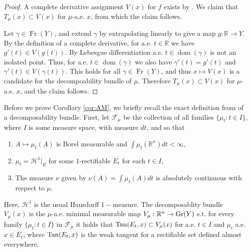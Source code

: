\documentclass{amsart}
\numberwithin{equation}{section}
\newcommand{\R}{\mathbb{R}}
\newcommand{\dom}{\operatorname{dom}}
\newcommand{\Fr}{\operatorname{Fr}}
\begin{document}
\begin{proof}
A complete derivative assignment $V(x)$ for $f$ exists by \cite[Proposition 5.1 and Theorem 5.7]{malevapreiss}. We claim that $T_\mu(x)\subset V(x)$ for $\mu$-a.e. $x$, from which the claim follows.

Let $\gamma \in \Fr(Y)$, and extend $\gamma$ by extrapolating linearly to give a map $g:\R\to Y$. By the definition of a complete derivative, for a.e. $t\in \R$ we have $g'(t)\in V(g(t))$. By Lebesgue differentiation a.e. $t\in \dom(\gamma)$ is not an isolated point. Thus, for a.e. $t\in \dom(\gamma)$ we also have $\gamma'(t)=g'(t)$ and $\gamma'(t)\in V(\gamma(t))$. This holds for all $\gamma\in \Fr(Y)$, and thus $x\mapsto V(x)$ is a candidate for the decompoability bundle of $\mu$. Therefore $T_\mu(x)\subset V(x)$ for $\mu$-a.e. $x$, and the claim follows.
\end{proof}
 
Before we prove Corollary \ref{cor:AM}, we briefly recall the exact definition from \cite[Section 2.6]{almar16} of a decomposability bundle. First, let $\mathcal{F}_\mu$ be the collection of all families $\{\mu_t : t\in I\}$, where $I$ is some measure space, with measure $dt$, and so that 
\begin{enumerate}
    \item $A\mapsto \mu_t(A)$ is Borel measurable and $\int \mu_t(\R^n) dt < \infty$,
    \item $\mu_t=\mathcal{H}^1|_E$ for some $1$-rectifiable $E_t$ for each $t\in I$,
    \item The measure $\nu$ given by $\nu(A)=\int \mu_t(A) dt$ is absolutely continuous with respect to $\mu$.
\end{enumerate}
Here, $\mathcal{H}^1$ is the usual Hausdorff $1-$measure.
The decomposablity bundle $V_\mu(x)$ is the $\mu$-a.e. minimal measurable map $V_\mu:\R^n \to {\rm Gr}(Y)$ s.t. for every family $\{\mu_t : t\in I\}$ in $\mathcal{F}_\mu$ it holds that ${\rm Tan}(E_t, x)\subset V_\mu(x)$ for a.e. $t\in I$ and $\mu_t$ a.e. $x\in E_t$, where ${\rm Tan}(E_t, x)$ is the weak tangent for a rectifiable set defined almost everywhere.
\end{document}

